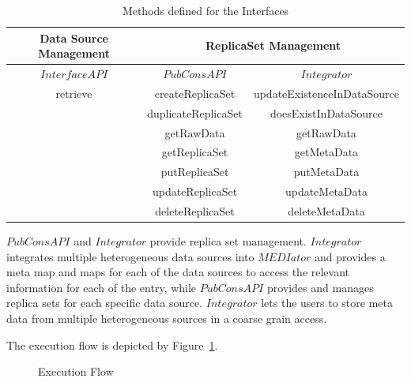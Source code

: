 \documentclass[conference]{IEEEtran}
\begin{document}
\begin{table}[!ht]
\centering
\caption{Methods defined for the Interfaces}
\label{table:interfaces}
\begin{tabular}{|c||c| |c|}

\toprule
\textbf{Data Source Management} & \multicolumn{2}{c}{\textbf{ReplicaSet Management}} \\
\midrule

\textbf{$InterfaceAPI$} & \textbf{$PubConsAPI$}&\textbf{$Integrator$} \\
\hline
retrieve & createReplicaSet&updateExistenceInDataSource \\
  & duplicateReplicaSet&doesExistInDataSource\\
  & getRawData&getRawData\\
 & getReplicaSet&getMetaData \\
 & putReplicaSet&putMetaData \\
 & updateReplicaSet&updateMetaData \\
 & deleteReplicaSet&deleteMetaData \\
\bottomrule
\end{tabular}
\end{table}

$PubConsAPI$ and $Integrator$ provide replica set management. $Integrator$ integrates multiple heterogeneous data sources into $MEDIator$ and provides a meta map and maps for each of the data sources to access the relevant information for each of the entry, while $PubConsAPI$ provides and manages replica sets for each specific data source. $Integrator$ lets the users to store meta data from multiple heterogeneous sources in a coarse grain access. 

The execution flow is depicted by Figure~\ref{fig:execution}.

\begin{figure}[!htbp]
	\begin{center}
	\end{center}
	\caption{Execution Flow}
	\label{fig:execution}
\end{figure}
\end{document}
